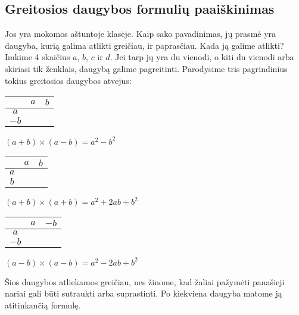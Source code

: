 \documentclass[a4paper]{article}
\newcommand{\high}[1]{\cellcolor{orange!80!white}{#1}}
\newcommand{\midd}[1]{\cellcolor{green!50!white}{#1}}
\newcommand{\low}[1]{\cellcolor{blue!50!white}{#1}}
\begin{document}
\subsection{Greitosios daugybos formulių paaiškinimas}
Jos yra mokomos aštuntoje klasėje. Kaip sako pavadinimas, jų prasmė yra daugyba, kurią galima atlikti greičiau, ir paprasčiau. Kada ją galime atlikti? Imkime 4 skaičius $a$, $b$, $c$ ir $d$. Jei tarp jų yra du vienodi, o kiti du vienodi arba skiriasi tik ženklais, daugybą galime pagreitinti. Parodysime tris pagrindinius tokius greitosios daugybos atvejus:
\newline\newline
\begin{minipage}[b]{0.3\linewidth}
\begin{center}
\begin{tabular}{c||c|c}
 & $a$ & $b$ \\ \hline \hline
 $a$ & \high{$a^2$} & \midd{$ab$}\\ \hline 
 $-b$ &  \midd{$-ab$}  & \low{$-b^2$}
\end{tabular}
\newline\newline\newline
$(a+b)\times(a-b) = a^2 - b^2$
\end{center}
\end{minipage}
\begin{minipage}[b]{0.3\linewidth}
\begin{center}
\begin{tabular}{c||c|c}
 & $a$ & $b$ \\ \hline \hline
 $a$ & \high{$a^2$} & \midd{$ab$}\\ \hline 
 $b$ &  \midd{$ab$}  & \low{$b^2$}
\end{tabular}
\newline\newline\newline
$(a+b)\times(a+b) = a^2 +2ab+b^2$
\end{center}
\end{minipage}
\begin{minipage}[b]{0.3\linewidth}
\begin{center}
\begin{tabular}{c||c|c}
 & $a$ & $-b$ \\ \hline \hline
 $a$ & \high{$a^2$} & \midd{$-ab$}\\ \hline 
 $-b$ &  \midd{$-ab$}  & \low{$b^2$}
\end{tabular}
\newline\newline\newline
$(a-b)\times(a-b) = a^2 - 2ab+b^2$
\end{center}
\end{minipage}
\newline\newline
Šios daugybos atliekamos greičiau, nes žinome, kad žaliai pažymėti panašieji nariai gali būti sutraukti arba suprastinti. Po kiekviena daugyba matome ją atitinkančią formulę.
\end{document}
